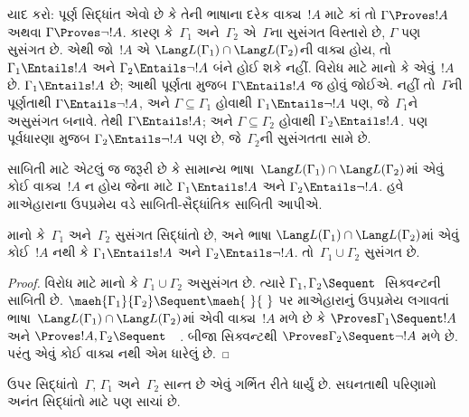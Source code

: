 યાદ કરો: પૂર્ણ સિદ્ધાંત એવો છે કે તેની
ભાષાના દરેક વાક્ય~$!A$ માટે
કાં તો $\Gamma \Proves !A$ અથવા
$\Gamma \Proves \lnot !A$.
કારણ કે~$\Gamma_1$ અને~$\Gamma_2$
એ~$\Gamma$ના સુસંગત વિસ્તારો છે,
$\Gamma$ પણ સુસંગત છે.
એથી જો~$!A$ એ
$\Lang L(\Gamma_1) \cap
\Lang L(\Gamma_2)$ની
વાક્ય હોય, તો
$\Gamma_1 \Entails !A$ અને
$\Gamma_2 \Entails \lnot !A$
બંને હોઈ શકે નહીં.
વિરોધ માટે માનો કે એવું~$!A$ છે.
$\Gamma_1 \Entails !A$ છે;
આથી પૂર્ણતા મુજબ
$\Gamma \Entails !A$ જ હોવું જોઈએ.
નહીં તો~$\Gamma$ની પૂર્ણતાથી
$\Gamma \Entails \lnot !A$,
અને $\Gamma \subseteq \Gamma_1$
હોવાથી
$\Gamma_1 \Entails \lnot !A$ પણ,
જે~$\Gamma_1$ને અસુસંગત બનાવે.
તેથી $\Gamma \Entails !A$;
અને $\Gamma \subseteq \Gamma_2$
હોવાથી
$\Gamma_2 \Entails !A$.
પણ પૂર્વધારણા મુજબ
$\Gamma_2 \Entails \lnot !A$ પણ છે,
જે~$\Gamma_2$ની સુસંગતતા સામે છે.

સાબિતી માટે એટલું જ જરૂરી છે કે
સામાન્ય
ભાષા~$\Lang L(\Gamma_1)
\cap \Lang L(\Gamma_2)$માં
એવું કોઈ વાક્ય~$!A$ ન હોય
જેના માટે
$\Gamma_1 \Entails !A$ અને
$\Gamma_2 \Entails \lnot !A$.
હવે માએહારાના ઉપપ્રમેય વડે
સાબિતી-સૈદ્ધાંતિક સાબિતી આપીએ.

\begin{thm}
માનો કે~$\Gamma_1$ અને~$\Gamma_2$
સુસંગત સિદ્ધાંતો છે, અને
ભાષા
$\Lang L(\Gamma_1) \cap
\Lang L(\Gamma_2)$માં એવું
કોઈ~$!A$ નથી કે
$\Gamma_1 \Entails !A$ અને
$\Gamma_2 \Entails \lnot !A$.
તો~$\Gamma_1 \cup \Gamma_2$
સુસંગત છે.
\end{thm}

\begin{proof}
  વિરોધ માટે માનો કે
  $\Gamma_1 \cup \Gamma_2$
  અસુસંગત છે. ત્યારે
  $\Gamma_1, \Gamma_2 \Sequent \ $
  સિક્વન્ટની સાબિતી છે.
  $\maeh{\Gamma_1}{\Gamma_2}
  \Sequent \maeh{\ }{\ }$
  પર માએહારાનું ઉપપ્રમેય
  લગાવતાં
  ભાષા~$\Lang L(\Gamma_1)
  \cap \Lang L(\Gamma_2)$માં
  એવી વાક્ય~$!A$ મળે છે કે
  $\Proves \Gamma_1 \Sequent !A$
  અને
  $\Proves !A, \Gamma_2 \Sequent \quad$.
  બીજા સિક્વન્ટથી
  $\Proves \Gamma_2 \Sequent \lnot !A$
  મળે છે. પરંતુ એવું કોઈ
  વાક્ય નથી એમ ધારેલું છે.
\end{proof}

ઉપર સિદ્ધાંતો~$\Gamma$,
$\Gamma_1$ અને~$\Gamma_2$
સાન્ત છે એવું ગર્ભિત રીતે
ધાર્યું છે. સઘનતાથી પરિણામો
અનંત સિદ્ધાંતો માટે પણ સાચાં છે.
\endgroup


